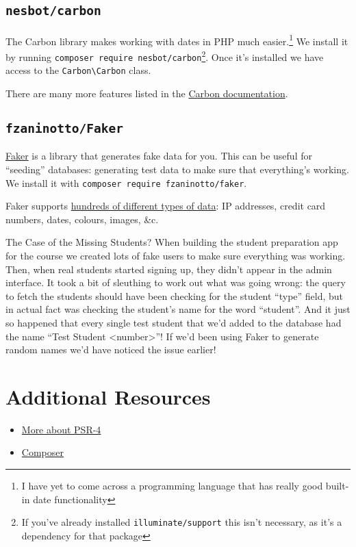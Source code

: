 


\subsection{\texttt{nesbot/carbon}}

The Carbon library makes working with dates in PHP much easier.\footnote{I have yet to come across a programming language that has really good built-in date functionality} We install it by running \texttt{composer require nesbot/carbon}\footnote{If you've already installed \texttt{illuminate/support} this isn't necessary, as it's a dependency for that package}. Once it's installed we have access to the \texttt{Carbon\textbackslash Carbon} class.


There are many more features listed in the \href{https://carbon.nesbot.com/docs/}{Carbon documentation}.


\subsection{\texttt{fzaninotto/Faker}}

\href{https://github.com/fzaninotto/Faker}{Faker} is a library that generates fake data for you. This can be useful for ``seeding'' databases: generating test data to make sure that everything's working. We install it with \texttt{composer require fzaninotto/faker}.


Faker supports \href{https://github.com/fzaninotto/Faker#formatters}{hundreds of different types of data}: IP addresses, credit card numbers, dates, colours, images, \&c.


\begin{infobox}{The Case of the Missing Students?}
    When building the student preparation app for the course we created lots of fake users to make sure everything was working. Then, when real students started signing up, they didn't appear in the admin interface. It took a bit of sleuthing to work out what was going wrong: the query to fetch the students should have been checking for the student ``type'' field, but in actual fact was checking the student's name for the word ``student''. And it just so happened that every single test student that we'd added to the database had the name ``Test Student <number>''! If we'd been using Faker to generate random names we'd have noticed the issue earlier!
\end{infobox}

\section{Additional Resources}

\begin{itemize}[leftmargin=*]
    \item \href{https://www.php-fig.org/psr/psr-4/meta/}{More about PSR-4}
    \item \href{https://getcomposer.org}{Composer}
\end{itemize}
